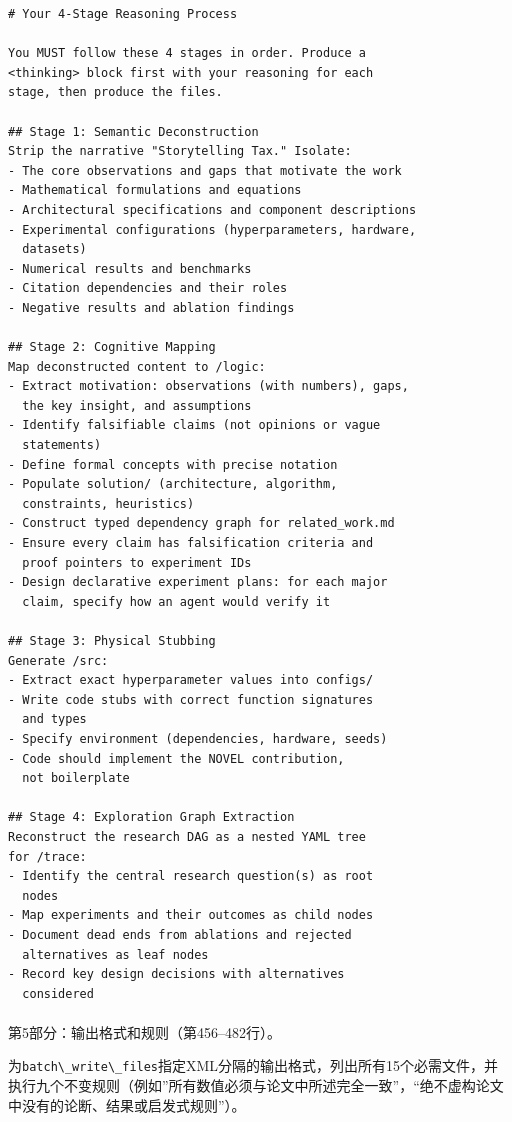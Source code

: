 \documentclass[
]{article}
\makeatletter
\let\oldparagraph\paragraph
\renewcommand{\paragraph}{
    \@ifstar
      \xxxParagraphStar
      \xxxParagraphNoStar
  }
\newcommand{\xxxParagraphStar}[1]{\oldparagraph*{#1}\mbox{}}
\newcommand{\xxxParagraphNoStar}[1]{\oldparagraph{#1}\mbox{}}
\newcommand{\passthrough}[1]{#1}
\theoremstyle{definition}
\makeatother
\begin{document}
\begin{lstlisting}
# Your 4-Stage Reasoning Process

You MUST follow these 4 stages in order. Produce a
<thinking> block first with your reasoning for each
stage, then produce the files.

## Stage 1: Semantic Deconstruction
Strip the narrative "Storytelling Tax." Isolate:
- The core observations and gaps that motivate the work
- Mathematical formulations and equations
- Architectural specifications and component descriptions
- Experimental configurations (hyperparameters, hardware,
  datasets)
- Numerical results and benchmarks
- Citation dependencies and their roles
- Negative results and ablation findings

## Stage 2: Cognitive Mapping
Map deconstructed content to /logic:
- Extract motivation: observations (with numbers), gaps,
  the key insight, and assumptions
- Identify falsifiable claims (not opinions or vague
  statements)
- Define formal concepts with precise notation
- Populate solution/ (architecture, algorithm,
  constraints, heuristics)
- Construct typed dependency graph for related_work.md
- Ensure every claim has falsification criteria and
  proof pointers to experiment IDs
- Design declarative experiment plans: for each major
  claim, specify how an agent would verify it

## Stage 3: Physical Stubbing
Generate /src:
- Extract exact hyperparameter values into configs/
- Write code stubs with correct function signatures
  and types
- Specify environment (dependencies, hardware, seeds)
- Code should implement the NOVEL contribution,
  not boilerplate

## Stage 4: Exploration Graph Extraction
Reconstruct the research DAG as a nested YAML tree
for /trace:
- Identify the central research question(s) as root
  nodes
- Map experiments and their outcomes as child nodes
- Document dead ends from ablations and rejected
  alternatives as leaf nodes
- Record key design decisions with alternatives
  considered
\end{lstlisting}

\paragraph{第5部分：输出格式和规则（第456--482行）。}\label{ux7b2c5ux90e8ux5206ux8f93ux51faux683cux5f0fux548cux89c4ux5219ux7b2c456482ux884c}

为\passthrough{\lstinline!batch\_write\_files!}指定XML分隔的输出格式，列出所有15个必需文件，并执行九个不变规则（例如''所有数值必须与论文中所述完全一致''，``绝不虚构论文中没有的论断、结果或启发式规则''）。
\end{document}

